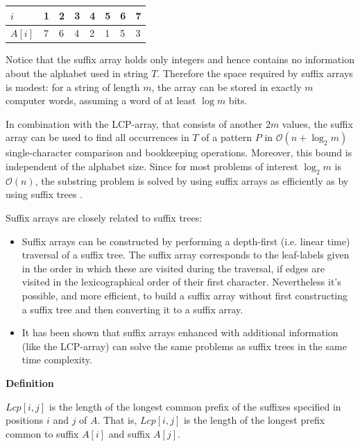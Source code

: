 \documentclass[a4paper,12pt, oneside]{article}
\begin{document}
\begin{table}[h!]
\centering
\label{suffix-array4}
\begin{tabular}{llllllll}
$i$ & 1 & 2 & 3 & 4 & 5 & 6 & 7 \\
\hline
$A[i]$ & 7 & 6 & 4 & 2 & 1 & 5 & 3
\end{tabular}
\end{table}

Notice that the suffix array holds only integers and hence contains no information about the alphabet used in string $T$. Therefore the space required by suffix arrays is modest: for a string of length $m$, the array can be stored in exactly $m$ computer words, assuming a word of at least $\log m$ bits. \par
In combination with the LCP-array, that consists of another $2m$ values, the suffix array can be used to find all occurrences in $T$ of a pattern $P$ in $\mathcal{O}(n+\log_2 m)$ single-character comparison and bookkeeping operations. Moreover, this bound is independent of the alphabet size. Since for most problems of interest $\log_2 m$ is $\mathcal{O}(n)$, the substring problem is solved by using suffix arrays as efficiently as by using suffix trees \cite{gusfield}.

Suffix arrays are closely related to suffix trees:

\begin{itemize}
	\item Suffix arrays can be constructed by performing a depth-first (i.e. linear time) traversal of a suffix tree. The suffix array corresponds to the leaf-labels given in the order in which these are visited during the traversal, if edges are visited in the lexicographical order of their first character.
	Nevertheless it's possible, and more efficient, to build a suffix array without first constructing a suffix tree and then converting it to a suffix array.
	\item It has been shown \cite{abouelhoda} that suffix arrays enhanced with additional information (like the LCP-array) can solve the same problems as suffix trees in the same time complexity.
\end{itemize}

\newpage
\textbf{Definition}

\begin{displayquote}
$Lcp[i, j]$ is the length of the longest common prefix of the suffixes specified in positions $i$ and $j$ of $A$. That is, $Lcp[i, j]$ is the length of the longest prefix common to suffix $A[i]$ and suffix $A[j]$.
\end{displayquote}
\end{document}
